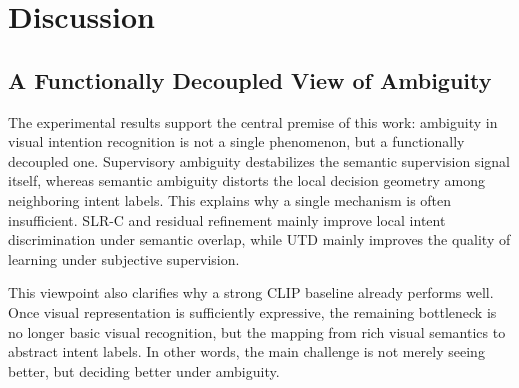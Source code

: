 \section{Discussion}
\label{sec:discussion}

\subsection{A Functionally Decoupled View of Ambiguity}

The experimental results support the central premise of this work: ambiguity in visual intention recognition is not a single phenomenon, but a functionally decoupled one. Supervisory ambiguity destabilizes the semantic supervision signal itself, whereas semantic ambiguity distorts the local decision geometry among neighboring intent labels. This explains why a single mechanism is often insufficient. SLR-C and residual refinement mainly improve local intent discrimination under semantic overlap, while UTD mainly improves the quality of learning under subjective supervision.

This viewpoint also clarifies why a strong CLIP baseline already performs well. Once visual representation is sufficiently expressive, the remaining bottleneck is no longer basic visual recognition, but the mapping from rich visual semantics to abstract intent labels. In other words, the main challenge is not merely seeing better, but deciding better under ambiguity.




